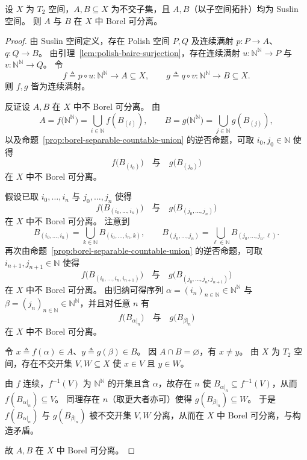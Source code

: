 \documentclass[lang=cn,a4paper,newtx,figureplace=section,tableplace=section]{elegantbook}
\begin{document}
\begin{theorem}\label{thm:lusin-separation}
  设 $X$ 为 $T_2$ 空间，$A,B\subseteq X$ 为不交子集，且 $A,B$（以子空间拓扑）均为 Suslin 空间。
  则 $A$ 与 $B$ 在 $X$ 中 Borel 可分离。
\end{theorem}

\begin{proof}
  由 Suslin 空间定义，存在 Polish 空间 $P,Q$ 及连续满射 $p:P\to A$、$q:Q\to B$。
  由引理~\ref{lem:polish-baire-surjection}，存在连续满射 $u:\mathbb{N}^{\mathbb{N}}\to P$ 与 $v:\mathbb{N}^{\mathbb{N}}\to Q$。
  令
  \[
    f\triangleq p\circ u:\mathbb{N}^{\mathbb{N}}\to A\subseteq X,\qquad g\triangleq q\circ v:\mathbb{N}^{\mathbb{N}}\to B\subseteq X.
  \]
  则 $f,g$ 皆为连续满射。

  反证设 $A,B$ 在 $X$ 中不 Borel 可分离。
  由
  \[
    A=f\bigl(\mathbb{N}^{\mathbb{N}}\bigr)=\bigcup_{i\in\mathbb{N}} f(B_{(i)}),\qquad
    B=g\bigl(\mathbb{N}^{\mathbb{N}}\bigr)=\bigcup_{j\in\mathbb{N}} g(B_{(j)}),
  \]
  以及命题~\ref{prop:borel-separable-countable-union} 的逆否命题，可取 $i_0,j_0\in\mathbb{N}$ 使得
  \[
    f\bigl(B_{(i_0)}\bigr)\quad\text{与}\quad g\bigl(B_{(j_0)}\bigr)
  \]
  在 $X$ 中不 Borel 可分离。

  假设已取 $i_0,\dots,i_n$ 与 $j_0,\dots,j_n$ 使得
  \[
    f\bigl(B_{(i_0,\dots,i_n)}\bigr)\quad\text{与}\quad g\bigl(B_{(j_0,\dots,j_n)}\bigr)
  \]
  在 $X$ 中不 Borel 可分离。
  注意到
  \[
    B_{(i_0,\dots,i_n)}=\bigcup_{k\in\mathbb{N}}B_{(i_0,\dots,i_n,k)},\qquad
    B_{(j_0,\dots,j_n)}=\bigcup_{\ell\in\mathbb{N}}B_{(j_0,\dots,j_n,\ell)}.
  \]
  再次由命题~\ref{prop:borel-separable-countable-union} 的逆否命题，可取 $i_{n+1},j_{n+1}\in\mathbb{N}$ 使得
  \[
    f\bigl(B_{(i_0,\dots,i_n,i_{n+1})}\bigr)\quad\text{与}\quad g\bigl(B_{(j_0,\dots,j_n,j_{n+1})}\bigr)
  \]
  在 $X$ 中不 Borel 可分离。
  由归纳可得序列 $\alpha=(i_n)_{n\in\mathbb{N}}\in\mathbb{N}^{\mathbb{N}}$ 与 $\beta=(j_n)_{n\in\mathbb{N}}\in\mathbb{N}^{\mathbb{N}}$，并且对任意 $n$ 有
  \[
    f\bigl(B_{\alpha\vert_n}\bigr)\quad\text{与}\quad g\bigl(B_{\beta\vert_n}\bigr)
  \]
  在 $X$ 中不 Borel 可分离。

  令 $x\triangleq f(\alpha)\in A$、$y\triangleq g(\beta)\in B$。
  因 $A\cap B=\varnothing$，有 $x\ne y$。
  由 $X$ 为 $T_2$ 空间，存在不交开集 $V,W\subseteq X$ 使 $x\in V$ 且 $y\in W$。

  由 $f$ 连续，$f^{-1}(V)$ 为 $\mathbb{N}^{\mathbb{N}}$ 的开集且含 $\alpha$，故存在 $n$ 使 $B_{\alpha\vert_n}\subseteq f^{-1}(V)$，从而 $f(B_{\alpha\vert_n})\subseteq V$。
  同理存在 $n$（取更大者亦可）使得 $g(B_{\beta\vert_n})\subseteq W$。
  于是 $f(B_{\alpha\vert_n})$ 与 $g(B_{\beta\vert_n})$ 被不交开集 $V,W$ 分离，从而在 $X$ 中 Borel 可分离，与构造矛盾。

  故 $A,B$ 在 $X$ 中 Borel 可分离。
\end{proof}
\end{document}

